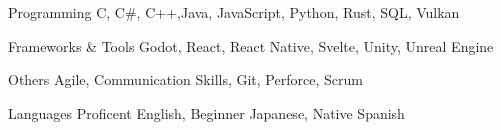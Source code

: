 

\begin{cvskills}

  \cvskill
    {Programming} %
    {C, C\#, C++,Java, JavaScript, Python, Rust, SQL, Vulkan}

  \cvskill
    {Frameworks \& Tools} %
    {Godot, React, React Native, Svelte, Unity, Unreal Engine} 

  \cvskill
    {Others} %
    {Agile, Communication Skills, Git, Perforce, Scrum}

  \cvskill
    {Languages} %
    {Proficent English, Beginner Japanese, Native Spanish}

\end{cvskills}
